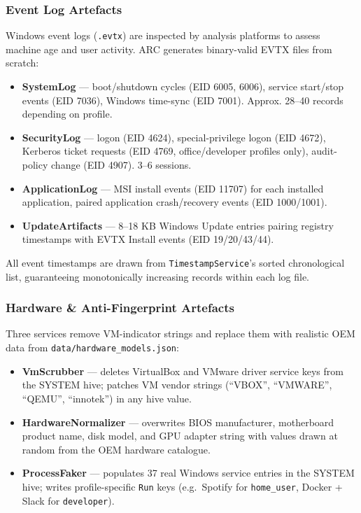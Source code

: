 \documentclass[12pt,a4paper]{article}
\begin{document}
\subsubsection{Event Log Artefacts}
Windows event logs (\texttt{.evtx}) are inspected by analysis platforms to
assess machine age and user activity.  ARC generates binary-valid EVTX files
from scratch:

\begin{itemize}[noitemsep,leftmargin=2em]
  \item \textbf{SystemLog} — boot/shutdown cycles (EID 6005, 6006), service
        start/stop events (EID 7036), Windows time-sync (EID 7001).  Approx.
        28–40 records depending on profile.
  \item \textbf{SecurityLog} — logon (EID 4624), special-privilege logon
        (EID 4672), Kerberos ticket requests (EID 4769, office/developer
        profiles only), audit-policy change (EID 4907).  3–6 sessions.
  \item \textbf{ApplicationLog} — MSI install events (EID 11707) for each
        installed application, paired application crash/recovery events
        (EID 1000/1001).
  \item \textbf{UpdateArtifacts} — 8–18 KB Windows Update entries pairing
        registry timestamps with EVTX Install events (EID 19/20/43/44).
\end{itemize}

All event timestamps are drawn from \texttt{TimestampService}'s sorted
chronological list, guaranteeing monotonically increasing records within each
log file.

\subsubsection{Hardware \& Anti-Fingerprint Artefacts}
Three services remove VM-indicator strings and replace them with realistic OEM
data from \texttt{data/hardware\_models.json}:

\begin{itemize}[noitemsep,leftmargin=2em]
  \item \textbf{VmScrubber} — deletes VirtualBox and VMware driver service keys
        from the SYSTEM hive; patches VM vendor strings (``VBOX'', ``VMWARE'',
        ``QEMU'', ``innotek'') in any hive value.
  \item \textbf{HardwareNormalizer} — overwrites BIOS manufacturer, motherboard
        product name, disk model, and GPU adapter string with values drawn at
        random from the OEM hardware catalogue.
  \item \textbf{ProcessFaker} — populates 37 real Windows service entries in the
        SYSTEM hive; writes profile-specific \texttt{Run} keys (e.g.\ Spotify
        for \texttt{home\_user}, Docker + Slack for \texttt{developer}).
\end{itemize}
\end{document}
